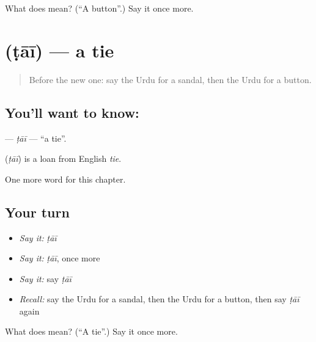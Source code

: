 \begin{tcolorbox}[breakable,colback=teal!4,colframe=teal!35!black,title={Before you move on}]
What does  mean? (\textquotedblleft{}A button\textquotedblright{}.) Say it once more.
\end{tcolorbox}
\section[\texorpdfstring{\ur{ٹائی} (ṭāī)}{ٹائی (ṭāī)}]{ (ṭāī) — a tie}

\label{lesson:UR-C122-tai}



\begin{quote}
Before the new one: say the Urdu for a sandal, then the Urdu for a button.
\end{quote}

\subsection*{You'll want to know: }
\textbf{} — \emph{ṭāī} — \textquotedblleft{}a tie\textquotedblright{}.

\begin{cousinweb}
\textbf{} (\emph{ṭāī}) is a loan from English \emph{tie}.
\end{cousinweb}

\begin{grammarlens}[title={What you've built}]
One more word for this chapter.
\end{grammarlens}

\subsection*{Your turn}
\begin{itemize}
\raggedright
  \item \emph{Say it:} \emph{ṭāī}
  \item \emph{Say it:} \emph{ṭāī}, once more
  \item \emph{Say it:} say \emph{ṭāī}
  \item \emph{Recall:} say the Urdu for a sandal, then the Urdu for a button, then say \emph{ṭāī} again
\end{itemize}

\begin{tcolorbox}[breakable,colback=teal!4,colframe=teal!35!black,title={Before you move on}]
What does  mean? (\textquotedblleft{}A tie\textquotedblright{}.) Say it once more.
\end{tcolorbox}
